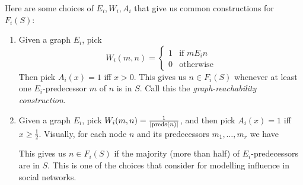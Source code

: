 \documentclass[letterpaper]{article}
\begin{document}
\begin{example*}
    Here are some choices of $E_i, W_i, A_i$ that give us common constructions for $F_i(S)$:
    \begin{enumerate}
        \item Given a graph $E_i$, pick 
        \[
            W_i(m, n) = 
            \begin{cases}
                1 & \mbox{if } m{E_i}n \\
                0 & \mbox{otherwise}
            \end{cases}
        \]
        Then pick $A_i(x) = 1$ iff $x > 0$. This gives us $n \in F_i(S)$ whenever at least one $E_i$-predecessor $m$ of $n$ is in $S$.  Call this the \emph{graph-reachability construction}.
        
        \item Given a graph $E_i$, pick $W_i(m, n) = \frac{1}{|\mathrm{preds}(n)|}$, and then pick $A_i(x) = 1$ iff $x \geq \frac{1}{2}$. Visually, for each node $n$ and its predecessors $m_1, \ldots, m_r$ we have
        \begin{center}
        \end{center}
        This gives us $n \in F_i(S)$ if the majority (more than half) of $E_i$-predecessors are in $S$.  This is one of the choices that \cite{baltag2019socialnetworks} consider for modelling influence in social networks.
        

\end{enumerate}
\end{example*}
\end{document}
